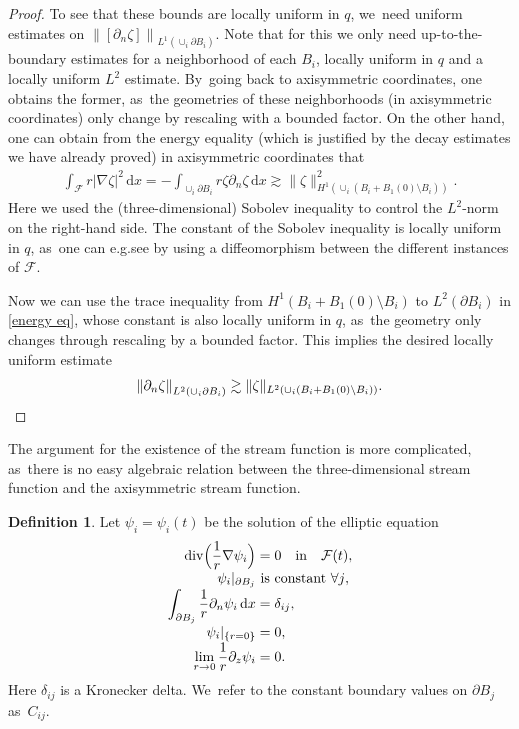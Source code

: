 \documentclass[10pt]{amsart}
\newcommand{\eg}{e.g.}
\let\backslash\setminus
\theoremstyle{definition}
\newtheorem{definition}[theorem]{Definition}
\renewcommand{\div}{\operatorname{div}}
\newcommand\norm[1]{\left\lVert #1\right\rVert}
\newcommand\anorm[1]{\lVert #1\rVert}
\newcommand\eq{=}
\newcommand\dd{\,\mathrm{d}}
\newcommand\dx{\dd x}
\let\de\partial
\begin{document}
\begin{proof}
To see that these bounds are locally uniform in $q$, we~need uniform estimates on $\norm{[\de_n\zeta]}_{L^1(\cup_i\de B_i)}$. Note that for this we only need up-to-the-boundary estimates for a neighborhood of each $B_i$, locally uniform in $q$ and a locally uniform $L^2$ estimate. By~going back to axisymmetric coordinates, one obtains the former, as~the geometries of these neighborhoods (in axisymmetric coordinates) only change by rescaling with a bounded factor.
On the other hand, one can obtain from the energy equality (which is justified by the decay estimates we have already proved) in axisymmetric coordinates that
\begin{align}\label{energy eq}
\int_{\mathcal{F}} r|\nabla\zeta|^2\dx\eq -\int_{\cup_i \de B_i}r\zeta\de_n \zeta\dx\gtrsim \anorm{\zeta}_{H^1(\cup_i (B_i+B_1(0)\backslash B_i))}^2.
\end{align}
Here we used the (three-dimensional) Sobolev inequality to control the $L^2$-norm on the right-hand side. The constant of the Sobolev inequality is locally uniform in $q$, as~one can \eg see by using a diffeomorphism between the different instances of $\mathcal{F}$.

Now we can use the trace inequality from $H^1(B_i+B_1(0)\backslash B_i)$ to $L^2(\de B_i)$ in \eqref{energy eq}, whose constant is also locally uniform in $q$, as~the geometry only changes through rescaling by a bounded factor. This implies the desired locally uniform estimate
\[
\norm{\de_n\zeta}_{L^2(\cup_i\de B_i)}\gtrsim\anorm{\zeta}_{L^2(\cup_i (B_i+B_1(0)\backslash B_i))}.\qedhere
\]
\end{proof}

\begingroup

The argument for the existence of the stream function is more complicated, as~there is no easy algebraic relation between the three-dimensional stream function and the axisymmetric stream function.

\begin{definition}\label{def psi}
Let $\psi_{i}=\psi_i(t)$ be the solution of the elliptic equation
\begin{equation}
\label{Flow}
\begin{aligned}
\div\Bigl(\frac{1}{r}\nabla\psi_{i}\Bigr)&\eq0\quad \mathrm{ in }\quad\text{}\mathcal{F}(t),\\[-3pt]
\psi_{i}|_{\de B_j}&\text{ is constant $\forall j$},\\[-3pt]
\int_{\de B_j}\frac{1}{r}\de_{n}\psi_{i}\dx&\eq\delta_{ij},\\[-3pt]
\psi_i|_{\{r=0\}}&\eq0,\\[-3pt]
\lim_{r\to 0}\frac{1}{r}\de_z\psi_i&\eq 0.
\end{aligned}
\end{equation}
Here $\delta_{ij}$ is a Kronecker delta. We~refer to the constant boundary values on $\de B_j$ as~$C_{ij}$.
\end{definition}
\end{document}
